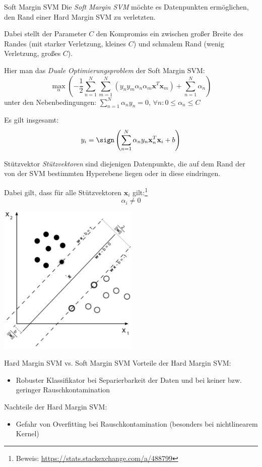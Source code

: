 \begin{defi}{Soft Margin SVM}
    Die \emph{Soft Margin SVM} möchte es Datenpunkten ermöglichen, den Rand einer Hard Margin SVM zu verletzten.

    Dabei stellt der Parameter $C$ den Kompromiss ein zwischen großer Breite des Randes (mit starker Verletzung, kleines $C$) und schmalem Rand (wenig Verletzung, großes $C$).

    Hier man das \emph{Duale Optimierungsproblem} der Soft Margin SVM:
    \[
        \max_\alpha \left( -\frac{1}{2} \sum_{n=1}^N \sum_{m=1}^N \left( y_n y_m \alpha_n \alpha_m \mathbf{x}^T \mathbf{x}_m \right) + \sum_{n=1}^N \alpha_n \right)
    \]
    unter den Nebenbedingungen: $\sum_{n=1}^N \alpha_n y_n = 0$, $\forall n: 0 \leq \alpha_n \leq C$

    Es gilt insgesamt:
    \[
        y_i = \sign \left( \sum_{n=1}^N \alpha_n y_n \mathbf{x}^T_n \mathbf{x}_i + b \right)
    \]
\end{defi}

\begin{defi}{Stützvektor}
    \emph{Stützvektoren} sind diejenigen Datenpunkte, die auf dem Rand der von der SVM bestimmten Hyperebene liegen oder in diese eindringen.

    Dabei gilt, dass für alle Stützvektoren $\mathbf{x}_i$ gilt:\footnote{Beweis: \href{https://stats.stackexchange.com/a/488799}{https://stats.stackexchange.com/a/488799}}
    \[
        \alpha_i \neq 0
    \]

    \begin{center}
        \includegraphics[width=0.5\textwidth]{includes/figures/defi_support_vector.png}
    \end{center}
\end{defi}

\begin{bonus}{Hard Margin SVM vs. Soft Margin SVM}
    Vorteile der Hard Margin SVM:
    \begin{itemize}
        \item Robuster Klassifikator bei Separierbarkeit der Daten und bei keiner bzw. geringer Rauschkontamination
    \end{itemize}

    Nachteile der Hard Margin SVM:
    \begin{itemize}
        \item Gefahr von Overfitting bei Rauschkontamination (besonders bei nichtlinearem Kernel)
    \end{itemize}
\end{bonus}

